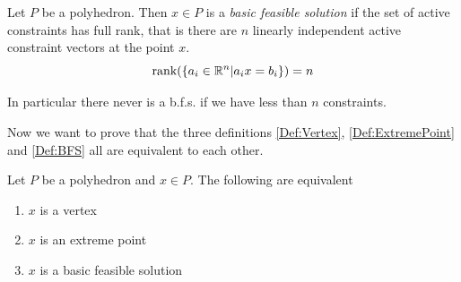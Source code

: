 \begin{Def}\label{Def:BFS} Let $P$ be a polyhedron. Then $x\in P$ is a \emph{basic feasible solution} if the set of active constraints has full rank, that is there are $n$ linearly independent active constraint vectors at the point $x$.
\[\mbox{rank}(\{a_i\in \mathbb{R}^n|a_ix=b_i\}) = n\]

In particular there never is a b.f.s. if we have less than $n$ constraints.
\end{Def}

Now we want to prove that the three definitions \ref{Def:Vertex}, \ref{Def:ExtremePoint} and \ref{Def:BFS} all are equivalent to each other.

\begin{thm} Let $P$ be a polyhedron and $x\in P$. The following are equivalent
\begin{enumerate}
\item $x$ is a vertex
\item $x$ is an extreme point
\item $x$ is a basic feasible solution
\end{enumerate}
\end{thm}